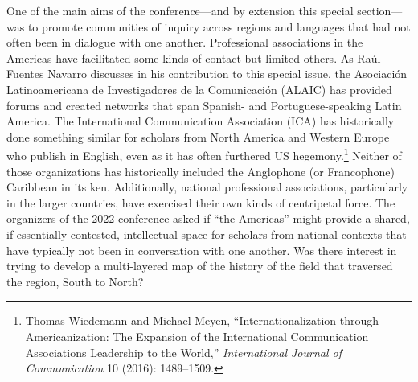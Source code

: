 \documentclass{tufte-handout}
\begin{document}
One of the main aims of the conference---and by extension this special
section---was to promote communities of inquiry across regions and
languages that had not often been in dialogue with one another.
Professional associations in the Americas have facilitated some kinds of
contact but limited others. As Raúl Fuentes Navarro discusses in his
contribution to this special issue, the Asociación Latinoamericana de
Investigadores de la Comunicación (ALAIC) has provided forums and
created networks that span Spanish- and Portuguese-speaking Latin
America. The International Communication Association (ICA) has
historically done something similar for scholars from North America and
Western Europe who publish in English, even as it has often furthered US
hegemony.\footnote{Thomas Wiedemann and Michael Meyen,
  ``Internationalization through Americanization: The Expansion of the
  International Communication Association\textquotesingle s Leadership
  to the World,'' \emph{International Journal of Communication} 10
  (2016): 1489--1509.} Neither of those organizations has historically
included the Anglophone (or Francophone) Caribbean in its ken.
Additionally, national professional associations, particularly in the
larger countries, have exercised their own kinds of centripetal force.
The organizers of the 2022 conference asked if ``the Americas'' might
provide a shared, if essentially contested, intellectual space for
scholars from national contexts that have typically not been in
conversation with one another. Was there interest in trying to develop a
multi-layered map of the history of the field that traversed the region,
South to North?
\end{document}
